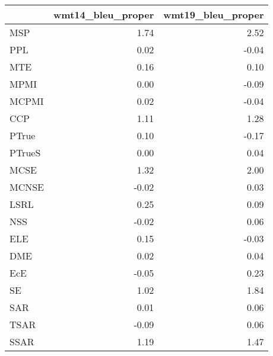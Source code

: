 \begin{tabular}{lrr}
\toprule
 & wmt14\_bleu\_proper & wmt19\_bleu\_proper \\
\midrule
MSP & 1.74 & 2.52 \\
PPL & 0.02 & -0.04 \\
MTE & 0.16 & 0.10 \\
MPMI & 0.00 & -0.09 \\
MCPMI & 0.02 & -0.04 \\
CCP & 1.11 & 1.28 \\
PTrue & 0.10 & -0.17 \\
PTrueS & 0.00 & 0.04 \\
MCSE & 1.32 & 2.00 \\
MCNSE & -0.02 & 0.03 \\
LSRL & 0.25 & 0.09 \\
NSS & -0.02 & 0.06 \\
ELE & 0.15 & -0.03 \\
DME & 0.02 & 0.04 \\
EcE & -0.05 & 0.23 \\
SE & 1.02 & 1.84 \\
SAR & 0.01 & 0.06 \\
TSAR & -0.09 & 0.06 \\
SSAR & 1.19 & 1.47 \\
\bottomrule
\end{tabular}

